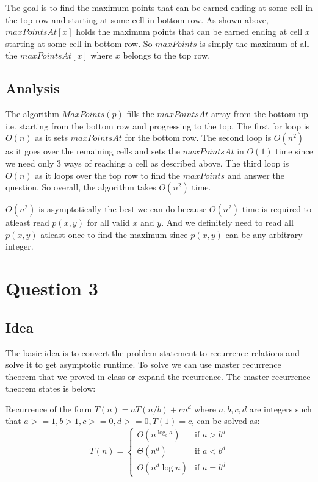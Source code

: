 \documentclass{article}
\begin{document}
    The goal is to find the maximum points that can be earned ending at some cell in the top row and starting at some cell in bottom row. As shown above, $maxPointsAt[x]$ holds the maximum points that can be earned ending at cell $x$ starting at some cell in bottom row. So $maxPoints$ is simply the maximum of all the $maxPointsAt[x]$ where $x$ belongs to the top row.

    \subsection*{Analysis}
    The algorithm $MaxPoints(p)$ fills the $maxPointsAt$ array from the bottom up i.e. starting from the bottom row and progressing to the top. The first for loop is $O(n)$ as it sets $maxPointsAt$ for the bottom row. The second loop is $O(n^2)$ as it goes over the remaining cells and sets the $maxPointsAt$ in $O(1)$ time since we need only 3 ways of reaching a cell as described above. The third loop is $O(n)$ as it loops over the top row to find the $maxPoints$ and answer the question. So overall, the algorithm takes $O(n^2)$ time.

    $O(n^2)$ is asymptotically the best we can do because $O(n^2)$ time is required to atleast read $p(x,y)$ for all valid $x$ and $y$. And we definitely need to read all $p(x,y)$ atleast once to find the maximum since $p(x,y)$ can be any arbitrary integer.

    \section*{Question 3}

    \subsection*{Idea}
    The basic idea is to convert the problem statement to recurrence relations and solve it to get asymptotic runtime. To solve we can use master recurrence theorem that we proved in class or expand the recurrence. The master recurrence theorem states is below:

    Recurrence of the form $T(n) = aT(n/b) + cn^d$ where $a, b, c, d$ are integers such that $a >= 1, b > 1, c >= 0, d >= 0, T(1) = c$, can be solved as:
    \begin{equation*}
        T(n) = 
        \begin{cases}
            \Theta(n^{\log_b a})    & \text{if $a > b^d$} \\
            \Theta(n^d)             & \text{if $a < b^d$} \\
            \Theta(n^d \log n)      & \text{if $a = b^d$}
        \end{cases}
    \end{equation*}
    
\end{document}
